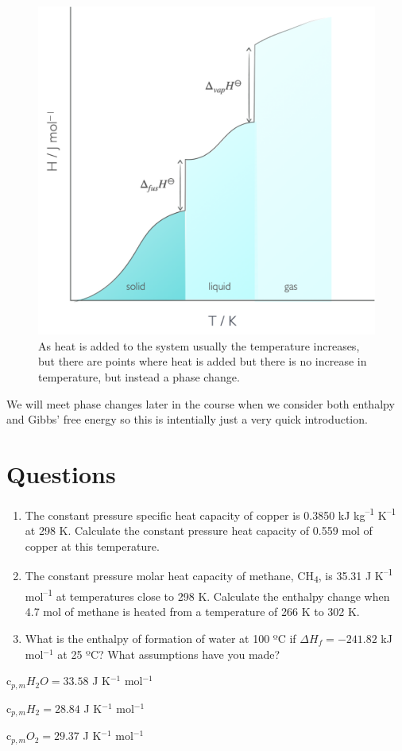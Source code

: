 \documentclass[
]{book}
\begin{document}
\begin{figure}

{\centering \includegraphics[width=0.3\linewidth]{images/enthalpyphasechange} 

}

\caption{As heat is added to the system usually the temperature increases, but there are points where heat is added but there is no increase in temperature, but instead a phase change.}\label{fig:enthalpyphasechange}
\end{figure}

We will meet phase changes later in the course when we consider both enthalpy and Gibbs' free energy so this is intentially just a very quick introduction.

\hypertarget{questions}{%
\section{Questions}\label{questions}}

\begin{enumerate}
\def\labelenumi{\arabic{enumi}.}
\item
  The constant pressure specific heat capacity of copper is 0.3850 kJ kg\textsuperscript{--1} K\textsuperscript{--1} at 298 K. Calculate the constant pressure heat capacity of 0.559 mol of copper at this temperature.
\item
  The constant pressure molar heat capacity of methane, CH\textsubscript{4}, is 35.31 J K\textsuperscript{--1} mol\textsuperscript{--1} at temperatures close to 298 K. Calculate the enthalpy change when 4.7 mol of methane is heated from a temperature of 266 K to 302 K.
\item
  What is the enthalpy of formation of water at 100 ºC if \(\Delta H_f = -241.82\) kJ mol\(^{-1}\) at 25 ºC? What assumptions have you made?
\end{enumerate}

c\(_{p,m} H_2 O = 33.58\) J K\(^{-1}\) mol\(^{-1}\)

c\(_{p,m} H_2 = 28.84\) J K\(^{-1}\) mol\(^{-1}\)

c\(_{p,m} O_2 = 29.37\) J K\(^{-1}\) mol\(^{-1}\)
\end{document}
